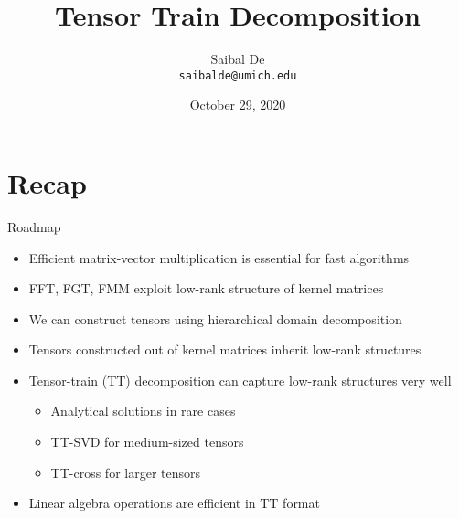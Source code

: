 \documentclass[aspectratio=169]{beamer}
\title{Tensor Train Decomposition}
\author[Saibal De]{Saibal De \\ \texttt{saibalde@umich.edu}}
\date{October 29, 2020}
\begin{document}
\begin{frame}
    \titlepage
\end{frame}

\section{Recap}

\begin{frame}{Roadmap}
  \begin{itemize}
    \item
      Efficient matrix-vector multiplication is essential for fast algorithms
    \item
      FFT, FGT, FMM exploit low-rank structure of kernel matrices
    \item
      We can construct tensors using hierarchical domain decomposition
    \item
      {\color{red} Tensors constructed out of kernel matrices inherit low-rank
      structures}
    \item
      Tensor-train (TT) decomposition can capture low-rank structures very well
      \begin{itemize}
        \item
          Analytical solutions in rare cases
        \item
          TT-SVD for medium-sized tensors
        \item
          {\color{red} TT-cross for larger tensors}
      \end{itemize}
    \item
      Linear algebra operations are efficient in TT format
  \end{itemize}
\end{frame}
\end{document}
